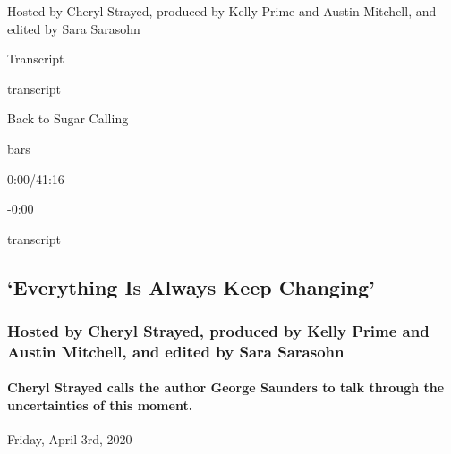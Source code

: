 Hosted by Cheryl Strayed, produced by Kelly Prime and Austin Mitchell,
and edited by Sara Sarasohn

Transcript

transcript

Back to Sugar Calling

bars

0:00/41:16

-0:00

transcript

\hypertarget{everything-is-always-keep-changing-2}{%
\subsection{`Everything Is Always Keep
Changing'}\label{everything-is-always-keep-changing-2}}

\hypertarget{hosted-by-cheryl-strayed-produced-by-kelly-prime-and-austin-mitchell-and-edited-by-sara-sarasohn-1}{%
\subsubsection{Hosted by Cheryl Strayed, produced by Kelly Prime and
Austin Mitchell, and edited by Sara
Sarasohn}\label{hosted-by-cheryl-strayed-produced-by-kelly-prime-and-austin-mitchell-and-edited-by-sara-sarasohn-1}}

\hypertarget{cheryl-strayed-calls-the-author-george-saunders-to-talk-through-the-uncertainties-of-this-moment-2}{%
\paragraph{Cheryl Strayed calls the author George Saunders to talk
through the uncertainties of this
moment.}\label{cheryl-strayed-calls-the-author-george-saunders-to-talk-through-the-uncertainties-of-this-moment-2}}

Friday, April 3rd, 2020

